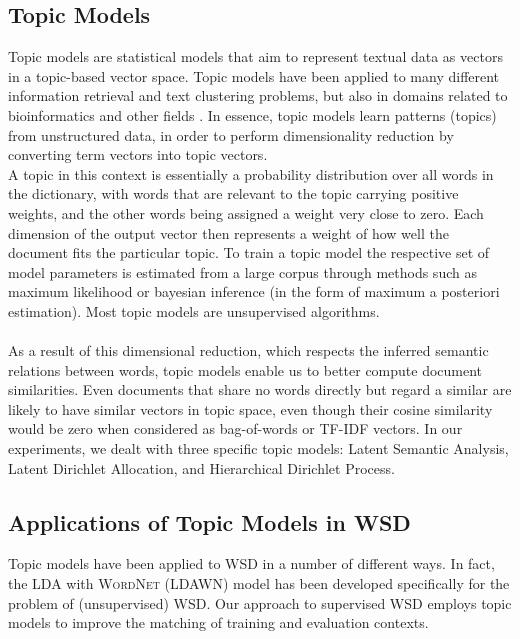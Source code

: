 \subsection{Topic Models}
Topic models are statistical models that aim to represent textual data as vectors in a topic-based vector space. Topic models have been applied to many different information retrieval and text clustering problems, but also in domains related to bioinformatics and other fields \cite{topicmodel_applications}. In essence, topic models learn patterns (topics) from unstructured data, in order to perform dimensionality reduction by converting term vectors into topic vectors. \\
A topic in this context is essentially a probability distribution over all words in the dictionary, with words that are relevant to the topic carrying positive weights, and the other words being assigned a weight very close to zero. Each dimension of the output vector then represents a weight of how well the document fits the particular topic. To train a topic model the respective set of model parameters is estimated from a large corpus through methods such as maximum likelihood or bayesian inference (in the form of maximum a posteriori estimation). Most topic models are unsupervised algorithms.\\\\
As a result of this dimensional reduction, which respects the inferred semantic relations between words, topic models enable us to better compute document similarities. Even documents that share no words directly but regard a similar are likely to have similar vectors in topic space, even though their cosine similarity would be zero when considered as bag-of-words or TF-IDF vectors. In our experiments, we dealt with three specific topic models: Latent Semantic Analysis\cite{LSA_paper}, Latent Dirichlet Allocation\cite{LDA_paper}, and Hierarchical Dirichlet Process\cite{HDP_paper}.


\subsection{Applications of Topic Models in WSD}
Topic models have been applied to WSD in a number of different ways\cite{topic_models_in_wsd}. In fact, the LDA with \textsc{WordNet} (LDAWN) model has been developed specifically for the problem of (unsupervised) WSD.
Our approach to supervised WSD employs topic models to improve the matching of training and evaluation contexts.